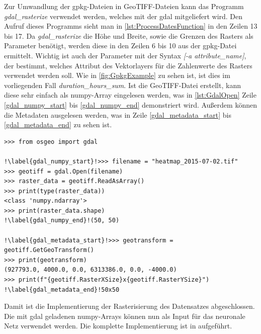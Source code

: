 Zur Umwandlung der \acrshort{gpkg}-Dateien in GeoTIFF-Dateien kann das Programm \emph{gdal\_rasterize} verwendet werden, welches mit der \acrfull{gdal} mitgeliefert wird.
Den Aufruf dieses Programms sieht man in \autoref{lst:ProcessDatesFunction} in den Zeilen 13 bis 17.
Da \emph{gdal\_rasterize} die Höhe und Breite, sowie die Grenzen des Rasters als Parameter benötigt, werden diese in den Zeilen 6 bis 10 aus der \acrshort{gpkg}-Datei ermittelt.
Wichtig ist auch der Parameter mit der Syntax \emph{[-a attribute\_name]}, der bestimmt, welches Attribut des Vektorlayers für die Zahlenwerte des Rasters verwendet werden soll.
Wie in \autoref{fig:GpkgExample} zu sehen ist, ist dies im vorliegenden Fall \emph{duration\_hours\_sum}.
Ist die GeoTIFF-Datei erstellt, kann diese sehr einfach als numpy-Array eingelesen werden, was in \autoref{lst:GdalOpen} Zeile \ref{gdal_numpy_start} bis \ref{gdal_numpy_end} demonstriert wird.
Außerdem können die Metadaten ausgelesen werden, was in Zeile \ref{gdal_metadata_start} bis \ref{gdal_metadata_end} zu sehen ist.

\begin{code}
\begin{verbatim}
>>> from osgeo import gdal

!\label{gdal_numpy_start}!>>> filename = "heatmap_2015-07-02.tif"
>>> geotiff = gdal.Open(filename)
>>> raster_data = geotiff.ReadAsArray()
>>> print(type(raster_data))
<class 'numpy.ndarray'>
>>> print(raster_data.shape)
!\label{gdal_numpy_end}!(50, 50)

!\label{gdal_metadata_start}!>>> geotransform = geotiff.GetGeoTransform()
>>> print(geotransform)
(927793.0, 4000.0, 0.0, 6313386.0, 0.0, -4000.0)
>>> print(f"{geotiff.RasterXSize}x{geotiff.RasterYSize}")
!\label{gdal_metadata_end}!50x50
\end{verbatim}
\label{lst:GdalOpen}
\end{code}

Damit ist die Implementierung der Rasterisierung des Datensatzes abgeschlossen.
Die mit \acrshort{gdal} geladenen numpy-Arrays können nun als Input für das neuronale Netz verwendet werden.
Die komplette Implementierung ist in  aufgeführt.
